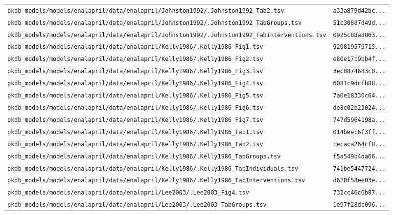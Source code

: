 \documentclass{article}
\begin{document}
\begin{longtable}{ll}
\texttt{pkdb\_models/models/enalapril/data/enalapril/Johnston1992/.Johnston1992\_Tab2.tsv} & \texttt{a33a879d42bc...} \\
\texttt{pkdb\_models/models/enalapril/data/enalapril/Johnston1992/.Johnston1992\_TabGroups.tsv} & \texttt{51c30887d49d...} \\
\texttt{pkdb\_models/models/enalapril/data/enalapril/Johnston1992/.Johnston1992\_TabInterventions.tsv} & \texttt{0925c88a8863...} \\
\texttt{pkdb\_models/models/enalapril/data/enalapril/Kelly1986/.Kelly1986\_Fig1.tsv} & \texttt{920819579715...} \\
\texttt{pkdb\_models/models/enalapril/data/enalapril/Kelly1986/.Kelly1986\_Fig2.tsv} & \texttt{e80e17c9bb4f...} \\
\texttt{pkdb\_models/models/enalapril/data/enalapril/Kelly1986/.Kelly1986\_Fig3.tsv} & \texttt{3ec0874683c0...} \\
\texttt{pkdb\_models/models/enalapril/data/enalapril/Kelly1986/.Kelly1986\_Fig4.tsv} & \texttt{6081c9dcfb88...} \\
\texttt{pkdb\_models/models/enalapril/data/enalapril/Kelly1986/.Kelly1986\_Fig5.tsv} & \texttt{7a0e18330c64...} \\
\texttt{pkdb\_models/models/enalapril/data/enalapril/Kelly1986/.Kelly1986\_Fig6.tsv} & \texttt{de8c02b23024...} \\
\texttt{pkdb\_models/models/enalapril/data/enalapril/Kelly1986/.Kelly1986\_Fig7.tsv} & \texttt{747d5964198a...} \\
\texttt{pkdb\_models/models/enalapril/data/enalapril/Kelly1986/.Kelly1986\_Tab1.tsv} & \texttt{014beec6f3ff...} \\
\texttt{pkdb\_models/models/enalapril/data/enalapril/Kelly1986/.Kelly1986\_Tab2.tsv} & \texttt{cecaca264cf8...} \\
\texttt{pkdb\_models/models/enalapril/data/enalapril/Kelly1986/.Kelly1986\_TabGroups.tsv} & \texttt{f5a549b4da66...} \\
\texttt{pkdb\_models/models/enalapril/data/enalapril/Kelly1986/.Kelly1986\_TabIndividuals.tsv} & \texttt{741be5447724...} \\
\texttt{pkdb\_models/models/enalapril/data/enalapril/Kelly1986/.Kelly1986\_TabInterventions.tsv} & \texttt{d620f58ee03e...} \\
\texttt{pkdb\_models/models/enalapril/data/enalapril/Lee2003/.Lee2003\_Fig4.tsv} & \texttt{732cc46c6b87...} \\
\texttt{pkdb\_models/models/enalapril/data/enalapril/Lee2003/.Lee2003\_TabGroups.tsv} & \texttt{1e97f28dc096...} \\

\end{longtable}
\end{document}
